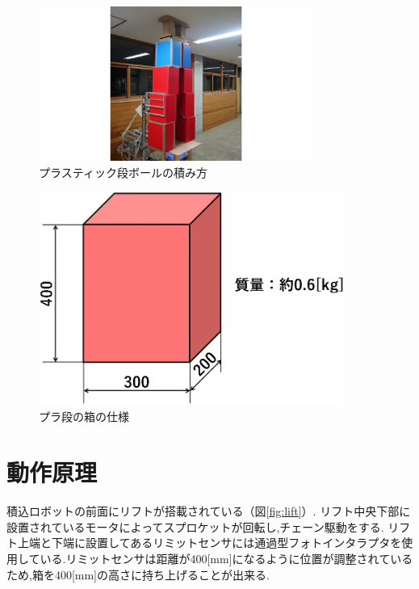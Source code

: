 \begin{figure}[htbp]
  \begin{center}
    \includegraphics[width=90mm]{img/tumikata.png}
    \end{center}
  \caption{プラスティック段ボールの積み方}
 \label{fig:tumikata}
\end{figure}

\begin{figure}[htbp]
  \begin{center}
    \includegraphics[width=100mm]{img/plabox.png}
    \end{center}
  \caption{プラ段の箱の仕様}
 \label{fig:plabox}
\end{figure}




\section{動作原理}
積込ロボットの前面にリフトが搭載されている（図\ref{fig:lift}）.
リフト中央下部に設置されているモータによってスプロケットが回転し,チェーン駆動をする.
リフト上端と下端に設置してあるリミットセンサには通過型フォトインタラプタを使用している.リミットセンサは距離が400[mm]になるように位置が調整されているため,箱を400[mm]の高さに持ち上げることが出来る.




